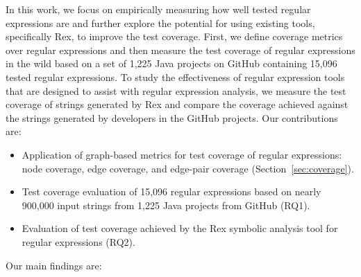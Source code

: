 In this work, we focus on empirically measuring how well tested regular expressions are and further explore the potential for using existing tools, specifically Rex, to improve the test coverage. 
First, we define coverage metrics over regular expressions and then measure the test coverage of regular expressions in the wild based on a set of 1,225 Java projects on GitHub containing 15,096 tested regular expressions. To study the effectiveness of regular expression tools that are designed to assist with regular expression analysis, we measure the test coverage of strings generated by Rex and compare the coverage achieved against the strings generated by developers in the GitHub projects. %
Our contributions are:
\vspace{-3pt}
\begin{itemize} 
\item Application of graph-based metrics for test coverage of regular expressions: node coverage, edge coverage, and edge-pair coverage (Section~\ref{sec:coverage}).
\item Test coverage evaluation of 15,096 regular expressions based on nearly 900,000 input strings from 1,225 Java projects from GitHub (RQ1).
\item Evaluation of test coverage achieved by the Rex symbolic analysis tool for regular expressions (RQ2).
\end{itemize}
\vspace{-3pt}
Our main findings are:
\vspace{-3pt}

